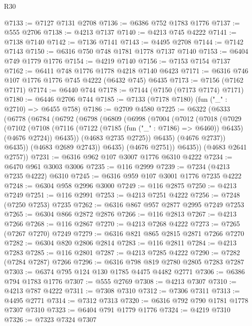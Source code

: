 \begin{lexlean}{R30}
\begin{coremodule}
{{{{{@7133 := @7127 @7131 @2708
@7136 := @6386 @752 @1783 @1776
@7137 := @555 @2706
@7138 := @4213 @7137
@7140 := @4213 @745 @4222
@7141 := @7138 @7140
@7142 := @7136 @7141
@7143 := @4495 @2708
@7144 := @7142 @7143
@7150 := @6316 @750 @748 @1781 @1778 @7137 @7140
@7153 := @6404 @749 @1779 @1776
@7154 := @4219 @7140
@7156 := @7153 @7154 @7137
@7162 := @6411 @748 @1776 @1778 @4218 @7140 @6423
@7171 := @6316 @746 @107 @1776 @1776 @745 @4222 (@6432 @745) @6435
@7173 := @7156 (@7162 @7171)
@7174 := @6440 @744
@7178 := @7144 (@7150 (@7173 @7174) @7171)
@7180 := @6446 @2706 @744
@7185 := @7133 (@7178 @7180) (fun ("_" : @2710) => @6455 @758)
@7186 := @2709 @4580
@7225 := @6322
    (@6333
      (@6778
        (@6784
          (@6792
            (@6798
              (@6809
                (@6998
                  (@7004
                    (@7012
                      (@7018
                        (@7029
                          (@7102
                            (@7108
                              (@7116
                                (@7122 (@7185 (fun ("_" : @7186) => @6460)) @6435)
                                (@4676 @2724))
                              @6435))
                          (@4683 @2735 @2725))
                        @6435)
                      (@4676 @2737))
                    @6435))
                (@4683 @2689 @2743))
              @6435)
            (@4676 @2751))
          @6435))
      (@4683 @2641 @2757))
@7231 := @6316 @962 @107 @3007 @1776 @6310 @4222
@7234 := @6470 @961 @3003 @3006
@7235 := @116 @2999
@7239 := @7234 (@4213 @7235 @4222) @6310
@7245 := @6316 @959 @107 @3001 @1776 @7235 @4222
@7248 := @6304 @958 @2996 @3000
@7249 := @116 @2875
@7250 := @4213 @7249
@7251 := @116 @2991
@7253 := @4213 @7251 @4222
@7256 := @7248 (@7250 @7253) @7235
@7262 := @6316 @867 @957 @2877 @2995 @7249 @7253
@7265 := @6304 @866 @2872 @2876
@7266 := @116 @2813
@7267 := @4213 @7266
@7268 := @116 @2867
@7270 := @4213 @7268 @4222
@7273 := @7265 (@7267 @7270) @7249
@7279 := @6316 @821 @865 @2815 @2871 @7266 @7270
@7282 := @6304 @820 @2806 @2814
@7283 := @116 @2811
@7284 := @4213 @7283
@7285 := @116 @2801
@7287 := @4213 @7285 @4222
@7290 := @7282 (@7284 @7287) @7266
@7296 := @6316 @798 @819 @2780 @2805 @7283 @7287
@7303 := @6374 @795 @124 @130 @1785 @4475 @4482 @2771
@7306 := @6386 @794 @1783 @1776
@7307 := @555 @2769
@7308 := @4213 @7307
@7310 := @4213 @787 @4222
@7311 := @7308 @7310
@7312 := @7306 @7311
@7313 := @4495 @2771
@7314 := @7312 @7313
@7320 := @6316 @792 @790 @1781 @1778 @7307 @7310
@7323 := @6404 @791 @1779 @1776
@7324 := @4219 @7310
@7326 := @7323 @7324 @7307
}}}}}
\end{coremodule}
\end{lexlean}
